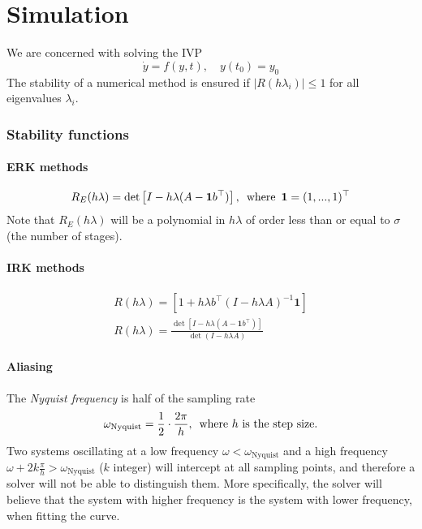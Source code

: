 \part{Simulation}
We are concerned with solving the IVP
\begin{equation}
    \Dot{y} = f(y,t), \quad y(t_0) = y_0
\end{equation}
The stability of a numerical method is ensured if $|R(h\lambda_i)| \leq 1$ for all eigenvalues $\lambda_i$.

\section{Stability functions}
\subsection{ERK methods}
\begin{equation}
    R_E(h\lambda) = \det \left[ I - h\lambda (A - \mathbf{1} b^\top) \right], \enskip \text{where} \enskip  \mathbf{1} = (1, ... , 1)^\top
\end{equation}
Note that $R_E(h\lambda)$ will be a polynomial in $h\lambda$ of order less than or equal to $\sigma$ (the number of stages).

\subsection{IRK methods}
\begin{align}
    R(h\lambda) = \left[ 1 + h\lambda b^\top (I-h\lambda A)^{-1} \mathbf{1} \right]\\
    R(h\lambda) = \frac{\det \left[ I - h\lambda(A - \mathbf{1}b^\top) \right]}{\det(I - h\lambda A)}
\end{align}

\subsection{Aliasing}
The \textit{Nyquist frequency} is half of the sampling rate
\begin{equation}
    \omega_{\text{Nyquist}} = \frac{1}{2} \cdot \frac{2\pi}{h}, \enskip \text{where $h$ is the step size.}
\end{equation}
Two systems oscillating at a low frequency $\omega < \omega_{\text{Nyquist}}$ and a high frequency $\omega + 2k\frac{\pi}{h} > \omega_{\text{Nyquist}}$ ($k$ integer) will intercept at all sampling points, and therefore a solver will not be able to distinguish them. More specifically, the solver will believe that the system with higher frequency is the system with lower frequency, when fitting the curve.

